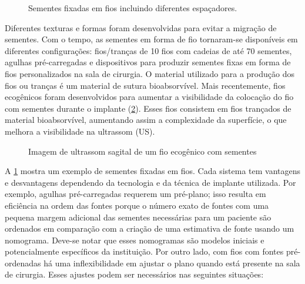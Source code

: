 \documentclass[11pt,a4paper]{article}
\newcounter{exemplo}
\begin{document}
	
	\begin{figure}
		\centering
		\caption{Sementes fixadas em fios incluindo diferentes espaçadores.}
		\label{fig:sementesAfixadas}
	\end{figure}

	Diferentes texturas e formas foram desenvolvidas para evitar a migração de sementes. Com o tempo, as sementes em forma de fio tornaram-se disponíveis em diferentes configurações: fios/tranças de 10 fios com cadeias de até 70 sementes, agulhas pré-carregadas e dispositivos para produzir sementes fixas em forma de fios personalizados na sala de cirurgia. O material utilizado para a produção dos fios ou tranças é um material de sutura bioabsorvível. Mais recentemente, fios ecogênicos foram desenvolvidos para aumentar a visibilidade da colocação do fio com sementes durante o implante (\ref{fig:ultrassonSagitalProstataImplante}). Esses fios consistem em fios trançados de material bioabsorvível, aumentando assim a complexidade da superfície, o que melhora a visibilidade na ultrassom (US).

	\begin{figure}[h]
		\centering
		\caption{Imagem de ultrassom sagital de um fio ecogênico com sementes}
		\label{fig:ultrassonSagitalProstataImplante}
	\end{figure}

	A \ref{fig:sementesAfixadas} mostra um exemplo de sementes fixadas em fios. Cada sistema tem vantagens e desvantagens dependendo da tecnologia e da técnica de implante utilizada. Por exemplo, agulhas pré-carregadas requerem um pré-plano; isso resulta em eficiência na ordem das fontes porque o número exato de fontes com uma pequena margem adicional das sementes necessárias para um paciente são ordenados em comparação com a criação de uma estimativa de fonte usando um nomograma. Deve-se notar que esses nomogramas são modelos iniciais e potencialmente específicos da instituição. Por outro lado, com fios com fontes pré-ordenadas há uma inflexibilidade em ajustar o plano quando está presente na sala de cirurgia. Esses ajustes podem ser necessários nas seguintes situações:
\end{document}
